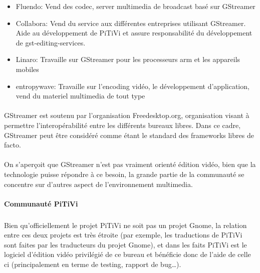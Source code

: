 \begin{itemize}

  \item {Fluendo: Vend des codec, server multimedia de broadcast basé
  sur GStreamer}

  \item {Collabora: Vend du service aux différentes entreprises utilisant
  GStreamer.
    Aide au développement de PiTiVi et assure responsabilité du
    développement de gst-editing-services.}

  \item {Linaro: Travaille sur GStreamer pour les processeurs arm et
  les appareils mobiles}

  \item {entropywave: Travaille sur l'encoding vidéo, le développement
  d'application, vend du materiel multimedia de tout type}

\end{itemize}

\paragraph{}

GStreamer est soutenu par l'organisation Freedesktop.org, organisation
visant à permettre l'interopérabilité entre les différents bureaux
libres. Dans ce cadre, GStreamer peut être considéré comme étant le
standard des frameworks libres de facto.

\paragraph{}

On s'aperçoit que GStreamer n'est pas vraiment orienté édition vidéo,
bien que la technologie puisse répondre à ce besoin, la grande partie
de la communauté se concentre sur d'autres aspect de l'environnement
multimedia.

\paragraph{Communauté PiTiVi}

\subparagraph{}

Bien qu'officiellement le projet PiTiVi ne soit pas un projet Gnome,
la relation entre ces deux projets est très étroite (par exemple, les
traductions de PiTiVi sont faites par les traducteurs du projet Gnome),
et dans les faits PiTiVi est le logiciel d'édition vidéo privilégié
de ce bureau et bénéficie donc de l'aide de celle ci (principalement
en terme de testing, rapport de bug\ldots).

